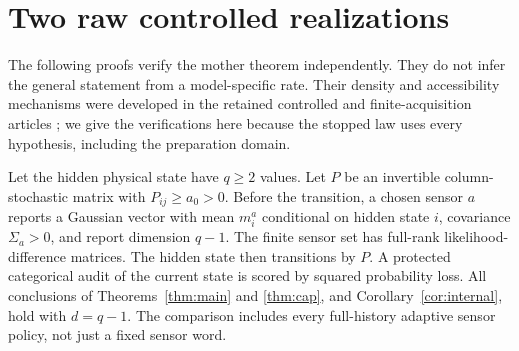\section{Two raw controlled realizations}\label{sec:realizations}
The following proofs verify the mother theorem independently. They do not infer the general statement from a model-specific rate. Their density and accessibility mechanisms were developed in the retained controlled and finite-acquisition articles \cite{GTFControlled,GTFFinite}; we give the verifications here because the stopped law uses every hypothesis, including the preparation domain.

\begin{theorem}\label{thm:gaussian}
Let the hidden physical state have $q\ge2$ values. Let $P$ be an invertible column-stochastic matrix with $P_{ij}\ge a_0>0$. Before the transition, a chosen sensor $a$ reports a Gaussian vector with mean $m_i^a$ conditional on hidden state $i$, covariance $\Sigma_a>0$, and report dimension $q-1$. The finite sensor set has full-rank likelihood-difference matrices. The hidden state then transitions by $P$. A protected categorical audit of the current state is scored by squared probability loss. All conclusions of Theorems~\ref{thm:main} and \ref{thm:cap}, and Corollary~\ref{cor:internal}, hold with $d=q-1$. The comparison includes every full-history adaptive sensor policy, not just a fixed sensor word.
\end{theorem}
